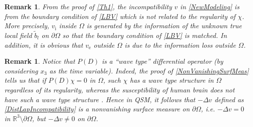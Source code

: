 \documentclass[reqno]{siamonline1116}
\numberwithin{theorem}{section}
\numberwithin{equation}{section}
\newtheorem{remark}[theorem]{Remark}
\def\R{{\mathbb R}}
\def\rd{\mathrm{d}}
\def\Om{\Omega}
\def\f{\frac}
\def\p{\partial}
\def\bn{\boldsymbol{n}}
\def\x{\boldsymbol{x}}
\def\mH{{\mathcal H}}
\def\ssi{\boldsymbol{\sigma}}
\def\wt{\widetilde}
\begin{document}


\begin{remark}\label{RK221} From the proof of \cref{Th1},  the incompatibility $v$ in \cref{NewModeling} is from the boundary condition of \cref{LBV} which is not related to the regularity of $\chi$. More precisely, $v_{\mathrm i}$ inside $\Om$ is generated by the information of the unknown true local field $\wt{b}_l$ on $\p\Om$ so that the boundary condition of \cref{LBV} is matched. In addition, it is obvious that $v_{\mathrm e}$ outside $\Om$ is due to the information loss outside $\Om$.
\end{remark}

\begin{remark}\label{RK222} Notice that $P(D)$ is a ``wave type'' differential operator (by considering $x_3$ as the time variable). Indeed, the proof of \cref{NonVanishingSurfMeas} tells us that if $P(D)\chi=0$ in $\Om$, such $\chi$ has a wave type structure in $\Om$ regardless of its regularity, whereas the susceptibility of human brain does not have such a wave type structure \cite{J.K.Choi2014}. Hence in QSM, it follows that $-\Delta v$ defined as \cref{DistLapIncompatibility} is a nonvanishing surface measure on $\p\Om$, i.e. $-\Delta v=0$ in $\R^3\setminus\p\Om$, but $-\Delta v\neq0$ on $\p\Om$.
\end{remark}

\end{document}
